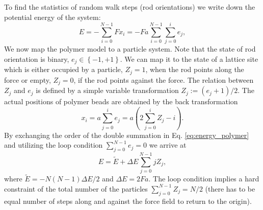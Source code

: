 \documentclass[aps,showpacs,twocolumn,floatfix,prx,superscriptaddress]{revtex4-1}
\begin{document}
To find the statistics of random walk steps (rod orientations) we write down the
potential energy of the system:
\begin{equation}
    \label{eq:energy_polymer}
    E  = -\sum_{i=0}^{N-1} {Fx_i} = -Fa\sum_{i=0}^{N-1} \sum_{j=0}^{i}e_j, 
\end{equation}
We now map the polymer model to a particle system. Note that the state of rod
orientation is binary, $e_j \in \left\{-1, +1\right\}$. We can map it to the
state of a lattice site which is either occupied by a particle, $Z_j = 1$, when
the rod points along the force or empty, $Z_j = 0$, if the rod points against
the force. The relation between $Z_j$ and $e_j$ is defined by a simple variable
transformation $Z_j := \left(e_j+1\right)/2$. The actual positions of polymer
beads are obtained by the back transformation
\begin{equation}
    \label{eq:z2x}
    x_i = a \sum_{j=0}^{i}{e_j} = a\left(2\sum_{j=0}^{i}{Z_j} -i\right).
\end{equation}
By exchanging the order of the double summation in Eq.
\eqref{eq:energy_polymer} and utilizing the loop condition  $\sum_{j=0}^{N-1}
e_j = 0$ we arrive at 
\begin{equation}
    \label{eq:energy_particle}
    E = \tilde{E} + \Delta E \sum_{j=0}^{N-1} j Z_j, 
\end{equation}
where $\tilde{E}= - N(N-1) \Delta E /2$ and $\Delta E = 2Fa$. The loop condition
implies a hard constraint of the total number of the particles $\sum_{j=0}^{N-1}
Z_j = N/2$ (there has to be equal number of steps along and against the force
field to return to the origin).
\end{document}
